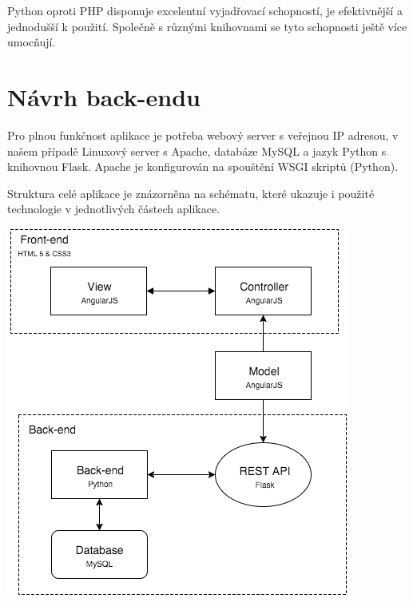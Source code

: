 \documentclass[11pt,a4paper]{article}
\begin{document}
Python oproti PHP disponuje excelentní vyjadřovací schopností, je efektivnější a jednodušší k použití. Společně s různými knihovnami se tyto schopnosti ještě více umocňují.

\section*{Návrh back-endu}
Pro plnou funkčnost aplikace je potřeba webový server s veřejnou IP adresou, v našem případě Linuxový server s Apache, databáze MySQL a jazyk Python s knihovnou Flask. Apache je konfigurován na spouštění WSGI skriptů (Python). 

Struktura celé aplikace je znázorněna na schématu, které ukazuje i použité technologie v jednotlivých částech aplikace.
\newline
\newline
\centerline{\includegraphics[scale=0.5]{schema.png}}

\end{document}
